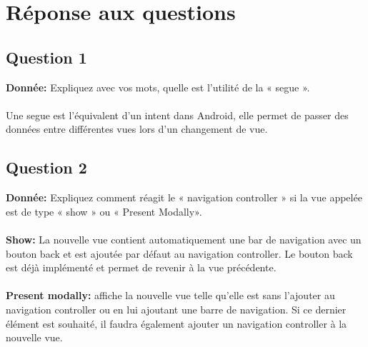 \section{Réponse aux questions}
\subsection{Question 1}
\textbf{Donnée: }Expliquez avec vos mots, quelle est l’utilité de la « segue ».\\\\
Une segue est l'équivalent d'un intent dans Android, elle permet de passer des données entre différentes vues lors d'un changement de vue.
\subsection{Question 2}
\textbf{Donnée: }Expliquez comment réagit le « navigation controller » si la vue appelée est de type « show » ou « Present Modally».\\\\
\textbf{Show: } La nouvelle vue contient automatiquement une bar de navigation avec un bouton back et est ajoutée par défaut au navigation controller. Le bouton back est déjà implémenté et permet de revenir à la vue précédente.\\\\
\textbf{Present modally:} affiche la nouvelle vue telle qu'elle est sans l'ajouter au navigation controller ou en lui ajoutant une barre de navigation. Si ce dernier élément est souhaité, il faudra également ajouter un navigation controller à la nouvelle vue.

